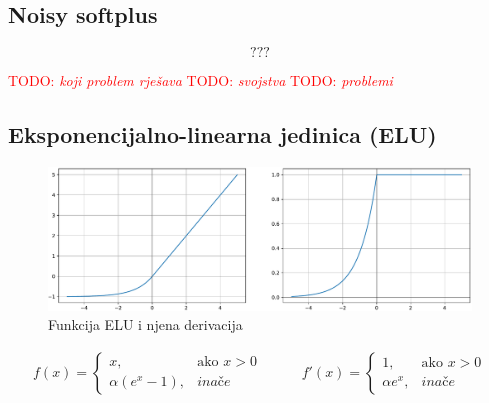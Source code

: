 \documentclass[times, utf8, numeric, diplomski]{fer}
\def\otherwise{\textit{inače}}
\def\TODO#1{\noindent\textcolor{red}{TODO: \textit{#1}}\newline}
\def\todo#1{\TODO{#1}}
\def\todoimg#1{\begin{center} \textcolor{red}{\big[ IMAGE: \textit{#1} \big]} \end{center}}
\begin{document}
\subsection{Noisy softplus}

\todoimg{}

\begin{equation}
???
\end{equation}

\todo{koji problem rješava}
\todo{svojstva}
\todo{problemi}
\fi %

\subsection{Eksponencijalno-linearna jedinica (ELU)}

\begin{figure}[H]
\includegraphics[width=\textwidth]{ELU.pdf}
\centering
\caption{Funkcija ELU i njena derivacija}
\label{fig:elu}
\end{figure}

\begin{equation}
\label{eq:elu}
\begin{split}
f(x) = 
\begin{cases}
x,					& \text{ako } x > 0 \\
\alpha (e^x - 1),	& \otherwise
\end{cases}
\end{split}
\qquad
\begin{split}
f'(x) = 
\begin{cases}
1,	 		& \text{ako } x > 0 \\
\alpha e^x,	& \otherwise
\end{cases}
\end{split}
\end{equation}
\end{document}
